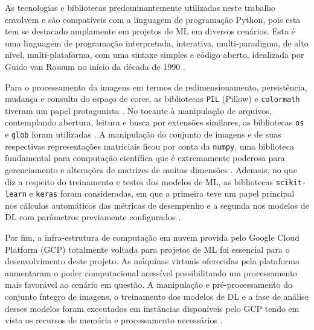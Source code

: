 As tecnologias e bibliotecas predominantemente utilizadas neste trabalho envolvem e são compatíveis com a linguagem de programação Python, pois esta tem se destacado amplamente em projetos de ML em diversos cenários. Esta é uma linguagem de programação interpretada, interativa, multi-paradigma,  de alto nível, multi-plataforma, com uma sintaxe simples e código aberto, idealizada por Guido van Rossum no início da década de 1990 \cite{ref:python}.

Para o processamento da imagens em termos de redimensionamento, persistência, mudança e consulta do espaço de cores, as bibliotecas \texttt{PIL} (Pillow) e \texttt{colormath} tiveram um papel protagonista \cite{lib:pillow,lib:colormath}. No tocante à manipulação de arquivos, contemplando abertura, leitura e busca por extensões similares, as bibliotecas \texttt{os} e \texttt{glob} foram utilizadas \cite{lib:os,lib:glob}. A manipulação do conjunto de imagens e de suas respectivas representações matriciais ficou por conta da \texttt{numpy}, uma biblioteca fundamental para computação científica que é extremamente poderosa para gerenciamento e alterações de matrizes de muitas dimensões \cite{lib:numpy}.  Ademais, no que diz a respeito do treinamento e testes dos modelos de ML, as bibliotecas \texttt{scikit-learn} e \texttt{keras} foram consideradas, em que a primeira teve um papel principal nos cálculos automáticos das métricas de desempenho e a segunda nos modelos de DL com parâmetros previamente configurados \cite{lib:scikit,lib:keras}.

Por fim, a infra-estrutura de computação em nuvem provida pelo Google Cloud Platform (GCP) totalmente voltada para projetos de ML foi essencial para o desenvolvimento deste projeto. As máquinas virtuais oferecidas pela plataforma aumentaram o poder computacional acessível possibilitando um processamento mais favorável ao cenário em questão. A manipulação e pré-processamento do conjunto íntegro de imagens, o treinamento dos modelos de DL e a fase de análise desses modelos foram executados em instâncias disponíveis pelo GCP tendo em vista os recursos de memória e processamento necessários \cite{tec:gcloud}.
